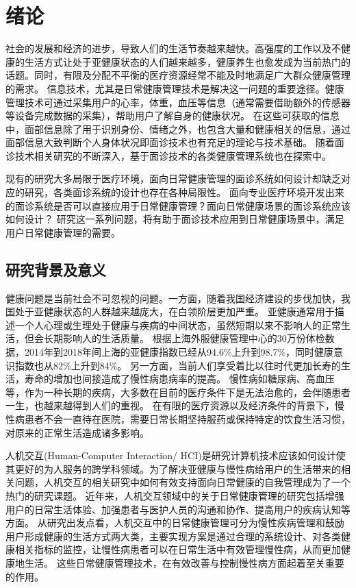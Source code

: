 \chapter{绪论}

社会的发展和经济的进步，导致人们的生活节奏越来越快。高强度的工作以及不健康的生活方式让处于亚健康状态的人们越来越多，健康养生也愈发成为当前热门的话题。同时，有限及分配不平衡的医疗资源经常不能及时地满足广大群众健康管理的需求\cite{雷鹏2019中国医疗资源配置与服务利用现状评价}。
信息技术，尤其是日常健康管理技术是解决这一问题的重要途径。健康管理技术可通过采集用户的心率，体重，血压等信息（通常需要借助额外的传感器等设备完成数据的采集），帮助用户了解自身的健康状况。
在这些可获取的信息中，面部信息除了用于识别身份、情绪之外，也包含大量和健康相关的信息，通过面部信息大致判断个人身体状况即面诊技术也有充足的理论与技术基础\cite{li2020tcminet}。
随着面诊技术相关研究的不断深入，基于面诊技术的各类健康管理系统也在探索中\cite{林锋2019中医面诊系统调研报告}。

现有的研究大多局限于医疗环境，面向日常健康管理的面诊系统如何设计却缺乏对应的研究，各类面诊系统的设计也存在各种局限性。
面向专业医疗环境开发出来的面诊系统是否可以直接应用于日常健康管理？面向日常健康场景的面诊系统应该如何设计？
研究这一系列问题，将有助于面诊技术应用到日常健康场景中，满足用户日常健康管理的需要。

\section{研究背景及意义}
健康问题是当前社会不可忽视的问题。一方面，随着我国经济建设的步伐加快，我国处于亚健康状态的人群越来越庞大，在白领阶层更加严重。
亚健康通常用于描述一个人心理或生理处于健康与疾病的中间状态，虽然短期以来不影响人的正常生活，但会长期影响人的生活质量。
根据上海外服健康管理中心的30万份体检数据，2014年到2018年间上海的亚健康指数已经从94.6\%上升到98.7\%，同时健康意识指数也从82\%上升到84\%\cite{health_report2019}。
另一方面，当前人们享受着比以往时代更加长寿的生活，寿命的增加也间接造成了慢性病患病率的提高\cite{OlshanskyDEMOGRAPHY}。
慢性病如糖尿病、高血压等，作为一种长期的疾病，大多数在目前的医疗条件下是无法治愈的，会伴随患者一生，也越来越得到人们的重视\cite{blandford2019hci}。
在有限的医疗资源以及经济条件的背景下，慢性病患者不会一直待在医院，需要日常长期坚持服药或保持特定的饮食生活习惯，对原来的正常生活造成诸多影响\cite{lupton2017self-tracking}。

人机交互(Human-Computer Interaction/ HCI)是研究计算机技术应该如何设计使其更好的为人服务的跨学科领域。为了解决亚健康与慢性病给用户的生活带来的相关问题，人机交互的相关研究中如何有效支持面向日常健康的自我管理成为了一个热门的研究课题。
近年来，人机交互领域中的关于日常健康管理的研究包括增强用户的日常生活体验、加强患者与医护人员的沟通和协作、提高用户的疾病认知等方面。
从研究出发点看，人机交互中的日常健康管理可分为慢性疾病管理和鼓励用户形成健康的生活方式两大类，主要实现方案是通过合理的系统设计、对各类健康相关指标的监控，让慢性病患者可以在日常生活中有效管理慢性病，从而更加健康地生活。
这些日常健康管理技术，在有效改善与控制慢性病方面起着至关重要的作用\cite{ayobi2017quantifying}。

